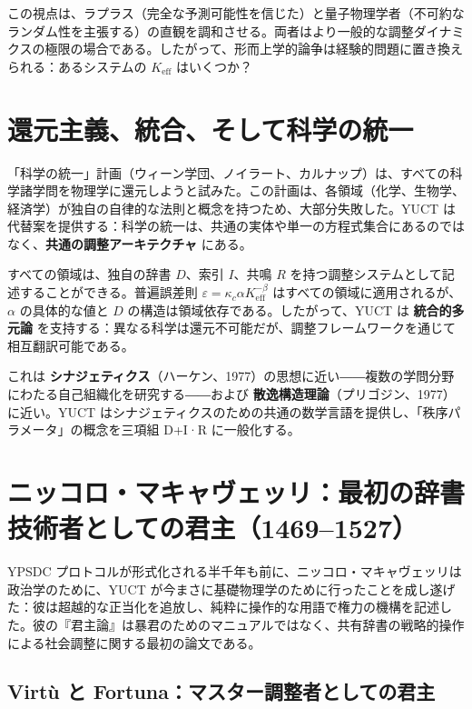 \documentclass[12pt,a4paper]{article}
\begin{document}
	この視点は、ラプラス（完全な予測可能性を信じた）と量子物理学者（不可約なランダム性を主張する）の直観を調和させる。両者はより一般的な調整ダイナミクスの極限の場合である。したがって、形而上学的論争は経験的問題に置き換えられる：あるシステムの \(K_{\mathrm{eff}}\) はいくつか？
	
	\section{還元主義、統合、そして科学の統一}
	
	「科学の統一」計画（ウィーン学団、ノイラート、カルナップ）は、すべての科学諸学問を物理学に還元しようと試みた。この計画は、各領域（化学、生物学、経済学）が独自の自律的な法則と概念を持つため、大部分失敗した。YUCT は代替案を提供する：科学の統一は、共通の実体や単一の方程式集合にあるのではなく、\textbf{共通の調整アーキテクチャ} にある。
	
	すべての領域は、独自の辞書 \(D\)、索引 \(I\)、共鳴 \(R\) を持つ調整システムとして記述することができる。普遍誤差則 \(\varepsilon = \kappa_c \alpha K_{\mathrm{eff}}^{-\beta}\) はすべての領域に適用されるが、\(\alpha\) の具体的な値と \(D\) の構造は領域依存である。したがって、YUCT は \textbf{統合的多元論} を支持する：異なる科学は還元不可能だが、調整フレームワークを通じて相互翻訳可能である。
	
	これは \textbf{シナジェティクス}（ハーケン、1977）の思想に近い――複数の学問分野にわたる自己組織化を研究する――および \textbf{散逸構造理論}（プリゴジン、1977）に近い。YUCT はシナジェティクスのための共通の数学言語を提供し、「秩序パラメータ」の概念を三項組 D+I·R に一般化する。
	
	\section{ニッコロ・マキャヴェッリ：最初の辞書技術者としての君主（1469–1527）}
	\label{sec:machiavelli}
	
	YPSDC プロトコルが形式化される半千年も前に、ニッコロ・マキャヴェッリは政治学のために、YUCT が今まさに基礎物理学のために行ったことを成し遂げた：彼は超越的な正当化を追放し、純粋に操作的な用語で権力の機構を記述した。彼の『君主論』は暴君のためのマニュアルではなく、共有辞書の戦略的操作による社会調整に関する最初の論文である。
	
	\subsection{Virtù と Fortuna：マスター調整者としての君主}
	
\end{document}
